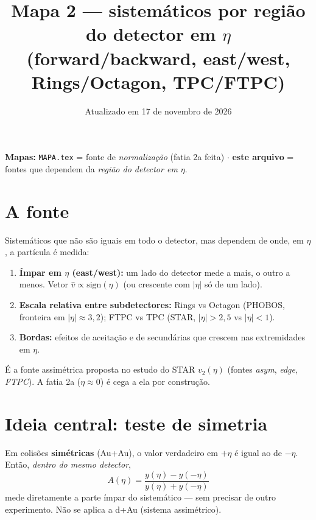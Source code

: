\documentclass[11pt,a4paper]{article}
\title{Mapa 2 --- sistemáticos por região do detector em $\eta$\\\large (forward/backward, east/west, Rings/Octagon, TPC/FTPC)}
\date{Atualizado em 17 de novembro de 2026}
\author{}
\newcommand{\arq}[1]{\texttt{\nolinkurl{#1}}}
\begin{document}
\maketitle
\vspace{-2em}

\textbf{Mapas:} \arq{MAPA.tex} = fonte de \emph{normalização} (fatia 2a feita) $\cdot$ \textbf{este arquivo} = fontes que dependem da \emph{região do detector em $\eta$}.

\section*{A fonte}
Sistemáticos que não são iguais em todo o detector, mas dependem de onde, em $\eta$, a partícula é medida:
\begin{enumerate}[nosep]
\item \textbf{Ímpar em $\eta$ (east/west):} um lado do detector mede a mais, o outro a menos. Vetor $\hat v\propto\mathrm{sign}(\eta)$ (ou crescente com $|\eta|$ só de um lado).
\item \textbf{Escala relativa entre subdetectores:} Rings vs Octagon (PHOBOS, fronteira em $|\eta|\approx3{,}2$); FTPC vs TPC (STAR, $|\eta|>2{,}5$ vs $|\eta|<1$).
\item \textbf{Bordas:} efeitos de aceitação e de secundárias que crescem nas extremidades em $\eta$.
\end{enumerate}
É a fonte assimétrica proposta no estudo do STAR $v_2(\eta)$ (fontes \emph{asym}, \emph{edge}, \emph{FTPC}). A fatia 2a ($\eta\approx0$) é cega a ela por construção.

\section*{Ideia central: teste de simetria}
Em colisões \textbf{simétricas} (Au+Au), o valor verdadeiro em $+\eta$ é igual ao de $-\eta$. Então, \emph{dentro do mesmo detector},
\[
A(\eta)=\frac{y(\eta)-y(-\eta)}{y(\eta)+y(-\eta)}
\]
mede diretamente a parte ímpar do sistemático --- sem precisar de outro experimento. Não se aplica a d+Au (sistema assimétrico).
\end{document}
